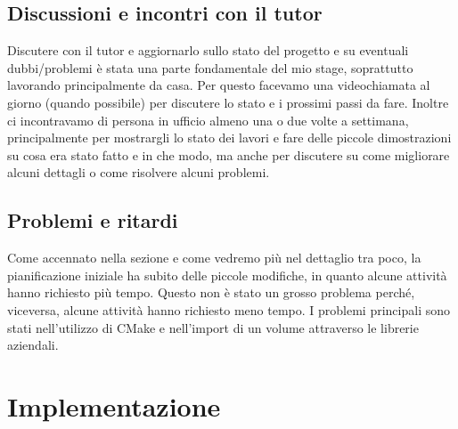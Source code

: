 \subsection{Discussioni e incontri con il tutor}
Discutere con il tutor e aggiornarlo sullo stato del progetto e su eventuali dubbi/problemi è stata una parte fondamentale del mio stage, soprattutto lavorando principalmente da casa. Per questo facevamo una videochiamata al giorno (quando possibile) per discutere lo stato e i prossimi passi da fare. Inoltre ci incontravamo di persona in ufficio almeno una o due volte a settimana, principalmente per mostrargli lo stato dei lavori e fare delle piccole dimostrazioni su cosa era stato fatto e in che modo, ma anche per discutere su come migliorare alcuni dettagli o come risolvere alcuni problemi.

\subsection{Problemi e ritardi}
Come accennato nella sezione  e come vedremo più nel dettaglio tra poco, la pianificazione iniziale ha subito delle piccole modifiche, in quanto alcune attività hanno richiesto più tempo. Questo non è stato un grosso problema perché, viceversa, alcune attività hanno richiesto meno tempo. I problemi principali sono stati nell'utilizzo di CMake e nell'import di un volume attraverso le librerie aziendali.

\section{Implementazione}

